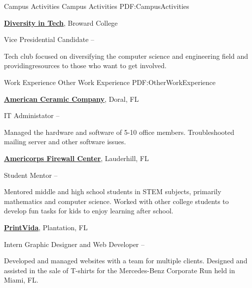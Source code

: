 \documentclass[letterpaper,MMMyyyy,nonstopmode]{simpleresumecv}
\begin{document}
\begin{Body}
\Section
{Campus Activities}
{Campus Activities}
{PDF:CampusActivities}

\Entry
\href{http://www.example.com/my-club}
{\textbf{Diversity in Tech}},
Broward College

\Gap
\BulletItem
Vice Presidential Candidate
\hfill
{} --
\begin{Detail}
\SubBulletItem
Tech club focused on diversifying the computer science and engineering field and providing\newline resources to those who want to get involved.
\end{Detail}


\Section
{Work\newline
Experience}
{Other Work Experience}
{PDF:OtherWorkExperience}

\Entry
\href{http://www.example.com/my-company}
{\textbf{American Ceramic Company}},
Doral, FL

\Gap
\BulletItem
IT Administator
\hfill
{} --
\begin{Detail}
\SubBulletItem
Managed the hardware and software of 5-10 office members.
\SubBulletItem
Troubleshooted mailing server and other software issues.
\end{Detail}

\Entry
\href{http://www.example.com/my-company}
{\textbf{Americorps Firewall Center}},
Lauderhill, FL

\Gap
\BulletItem
Student Mentor
\hfill
{} --
\begin{Detail}
\SubBulletItem
Mentored middle and high school students in STEM subjects, primarily mathematics and computer science.
\SubBulletItem
Worked with other college students to develop fun tasks for kids to enjoy learning after school.
\end{Detail}

\Entry
\href{http://www.example.com/my-company}
{\textbf{PrintVida}},
Plantation, FL

\Gap
\BulletItem
Intern Graphic Designer and Web Developer
\hfill
{} --
\begin{Detail}
\SubBulletItem
Developed and managed websites with a team for multiple clients.
\SubBulletItem
Designed and assisted in the sale of T-shirts for the Mercedes-Benz Corporate Run held in Miami, FL.
\end{Detail}


\end{Body}
\end{document}
